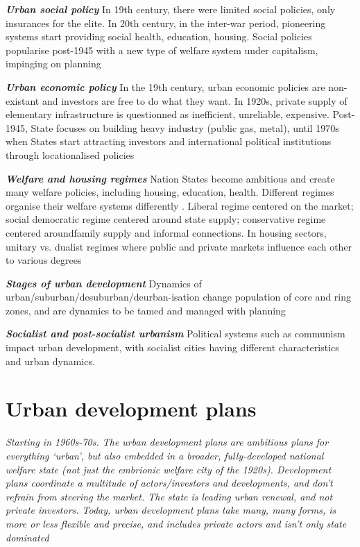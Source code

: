 \documentclass{article}
\newcommand{\bisection}[1]{\textbf{\textit{#1}}}
\newcommand{\alignedmarginpar}[1]{%
        \marginpar{\raggedright\small #1}
    }
\begin{document}
\bisection{Urban social policy} In 19th century, there were limited social policies, only insurances for the elite. In 20th century, in the inter-war period, pioneering systems start providing social health, education, housing. Social policies popularise post-1945 with a new type of welfare system under capitalism, impinging on planning

\bisection{Urban economic policy} In the 19th century, urban economic policies are non-existant and investors are free to do what they want. In 1920s, private supply of elementary infrastructure is questionned as inefficient, unreliable, expensive. Post-1945, State focuses on building heavy industry (public gas, metal), until 1970s when States start attracting investors and international political institutions through locationalised policies\alignedmarginpar{UN City Vienna}

\bisection{Welfare and housing regimes} Nation States become ambitious and create many welfare policies, including housing, education, health. Different regimes organise their welfare systems differently\alignedmarginpar{Welfare triangle}. Liberal regime centered on the market; social democratic regime centered around state supply; conservative regime centered aroundfamily supply and informal connections. In housing sectors, unitary vs. dualist regimes where public and private markets influence each other to various degrees

\bisection{Stages of urban development} Dynamics of urban/suburban/desuburban/deurban-isation change population of core and ring zones, and are dynamics to be tamed and managed with planning

\bisection{Socialist and post-socialist urbanism} Political systems such as communism impact urban development, with socialist cities having different characteristics and urban dynamics.

\pagebreak
\section{Urban development plans}

\textit{Starting in 1960s-70s. The urban development plans are ambitious plans for everything `urban', but also embedded in a broader, fully-developed national welfare state (not just the embrionic welfare city of the 1920s). Development plans coordinate a multitude of actors/investors and developments, and don't refrain from steering the market. The state is leading urban renewal, and not private investors. Today, urban development plans take many, many forms, is more or less flexible and precise, and includes private actors and isn't only state dominated}
\end{document}
